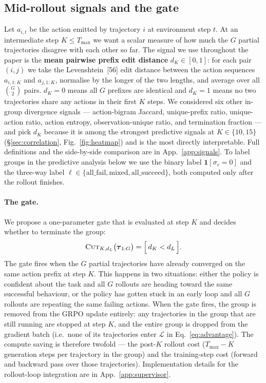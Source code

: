 \documentclass{article}
\begin{document}
\subsection{Mid-rollout signals and the gate}
\label{sec:method_signals}

Let $a_{i, t}$ be the action emitted by trajectory $i$ at
environment step $t$. At an intermediate step $K\!\le\!T_{\max}$
we want a scalar measure of how much the $G$ partial trajectories
disagree with each other so far. The signal we use throughout the
paper is the \textbf{mean pairwise prefix edit distance}
$d_K \in [0, 1]$: for each pair $(i, j)$ we take the
Levenshtein~[56] edit distance between the action sequences
$a_{i,1:K}$ and $a_{j,1:K}$, normalise by the longer of the two
lengths, and average over all $\binom{G}{2}$ pairs. $d_K\!=\!0$
means all $G$ prefixes are identical and $d_K\!=\!1$ means no two
trajectories share any actions in their first $K$ steps. We
considered six other in-group divergence signals --- action-bigram
Jaccard, unique-prefix ratio, unique-action ratio, action entropy,
observation-unique ratio, and termination fraction --- and pick
$d_K$ because it is among the strongest predictive signals at
$K\!\in\!\{10, 15\}$ (\S\ref{sec:correlation},
Fig.~\ref{fig:heatmap}) and is the most directly interpretable. Full definitions and the side-by-side
comparison are in App.~\ref{app:signals}. To label groups in the
predictive analysis below we use the binary label
$\mathbf{1}[\sigma_r\!=\!0]$ and the three-way label
$\ell\!\in\!\{\text{all\_fail}, \text{mixed}, \text{all\_succeed}\}$,
both computed only after the rollout finishes.

\paragraph{The gate.}
\label{sec:method_gate}
We propose a one-parameter gate that is evaluated at step $K$
and decides whether to terminate the group:
\begin{equation}
\textsc{Cut}_{K, d_L}\bigl(\boldsymbol{\tau}_{1:G}\bigr) =
\Bigl[\, d_K < d_L \,\Bigr].
\label{eq:gate}
\end{equation}
The gate fires when the $G$ partial trajectories have already
converged on the same action prefix at step $K$. This happens
in two situations: either the policy is confident about the task
and all $G$ rollouts are heading toward the same successful
behaviour, or the policy has gotten stuck in an early loop and
all $G$ rollouts are repeating the same failing actions. When
the gate fires, the group is removed from the GRPO update
entirely: any trajectories in the group that are still running
are stopped at step $K$, and the entire group is dropped from
the gradient batch (i.e.\ none of its trajectories enter
$\mathcal{L}$ in Eq.~\ref{eq:advantage}). The compute saving is
therefore twofold --- the post-$K$ rollout cost
($T_{\max}\!-\!K$ generation steps per trajectory in the group)
and the training-step cost (forward and backward pass over those
trajectories). Implementation details for the rollout-loop
integration are in App.~\ref{app:supervisor}.
\end{document}
